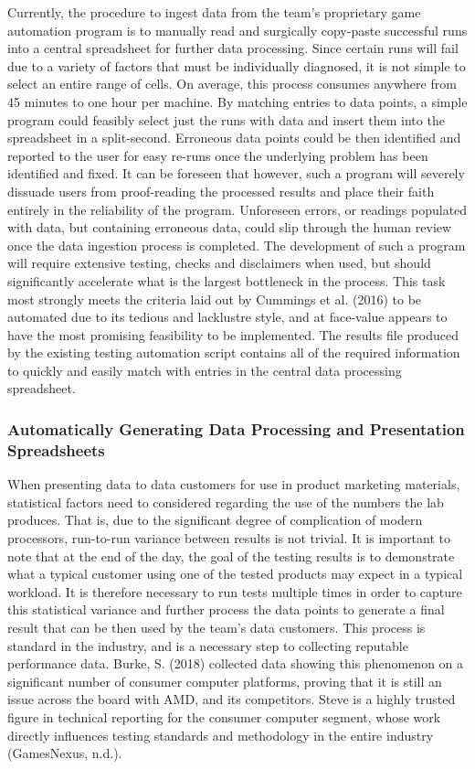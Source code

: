 \documentclass[12pt]{article}
\begin{document}
\indent\hspace{0.5in} Currently, the procedure to ingest data from the team’s proprietary game automation program is to manually read and surgically copy-paste successful runs into a central spreadsheet for further data processing. Since certain runs will fail due to a variety of factors that must be individually diagnosed, it is not simple to select an entire range of cells. On average, this process consumes anywhere from 45 minutes to one hour per machine. By matching entries to data points, a simple program could feasibly select just the runs with data and insert them into the spreadsheet in a split-second. Erroneous data points could be then identified and reported to the user for easy re-runs once the underlying problem has been identified and fixed. It can be foreseen that however, such a program will severely dissuade users from proof-reading the processed results and place their faith entirely in the reliability of the program. Unforeseen errors, or readings populated with data, but containing erroneous data, could slip through the human review once the data ingestion process is completed. The development of such a program will require extensive testing, checks and disclaimers when used, but should significantly accelerate what is the largest bottleneck in the process. This task most strongly meets the criteria laid out by Cummings et al. (2016) to be automated due to its tedious and lacklustre style, and at face-value appears to have the most promising feasibility to be implemented. The results file produced by the existing testing automation script contains all of the required information to quickly and easily match with entries in the central data processing spreadsheet.

\subsubsection{Automatically Generating Data Processing and Presentation Spreadsheets}
\indent\hspace{0.5in} When presenting data to data customers for use in product marketing materials, statistical factors need to considered regarding the use of the numbers the lab produces. That is, due to the significant degree of complication of modern processors, run-to-run variance between results is not trivial. It is important to note that at the end of the day, the goal of the testing results is to demonstrate what a typical customer using one of the tested products may expect in a typical workload. It is therefore necessary to run tests multiple times in order to capture this statistical variance and further process the data points to generate a final result that can be then used by the team's data customers. This process is standard in the industry, and is a necessary step to collecting reputable performance data. Burke, S. (2018) collected data showing this phenomenon on a significant number of consumer computer platforms, proving that it is still an issue across the board with AMD, and its competitors. Steve is a highly trusted figure in technical reporting for the consumer computer segment, whose work directly influences testing standards and methodology in the entire industry (GamesNexus, n.d.).  
\end{document}
